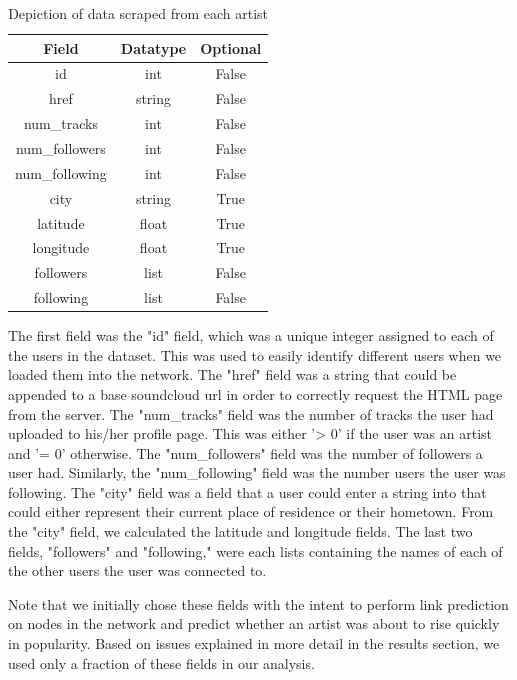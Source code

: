\documentclass{article}
\begin{document}
\begin{table}[h!]
	\centering
	\begin{tabular}{||c c c||} 
		\hline
		Field & Datatype & Optional \\ [0.5ex] 
		\hline\hline
		id & int & False \\
		\hline
		href & string & False \\ 
		\hline
		num\_tracks & int & False \\
		\hline
		num\_followers & int & False \\
		\hline
		num\_following & int & False \\
		\hline
		city & string & True \\
		\hline
		latitude & float & True \\
		\hline
		longitude & float & True \\
		\hline
		followers & list & False \\
		\hline
		following & list & False \\
		\hline
	\end{tabular}
	\caption{Depiction of data scraped from each artist}
	\label{Table:1}
\end{table}

The first field was the "id" field, which was a unique integer assigned to each of the users in the dataset.  This was used to easily identify different users when we loaded them into the network.  The "href" field was a string that could be appended to a base soundcloud url in order to correctly request the HTML page from the server.  The "num\_tracks" field was the number of tracks the user had uploaded to his/her profile page.  This was either '> 0' if the user was an artist and '= 0' otherwise.  The "num\_followers" field was the number of followers a user had.  Similarly, the "num\_following" field was the number users the user was following.  The "city" field was a field that a user could enter a string into that could either represent their current place of residence or their hometown.  From the "city" field, we calculated the latitude and longitude fields.  The last two fields, "followers" and "following," were each lists containing the names of each of the other users the user was connected to.

Note that we initially chose these fields with the intent to perform link prediction on nodes in the network and predict whether an artist was about to rise quickly in popularity.  Based on issues explained in more detail in the results section, we used only a fraction of these fields in our analysis.
\end{document}
